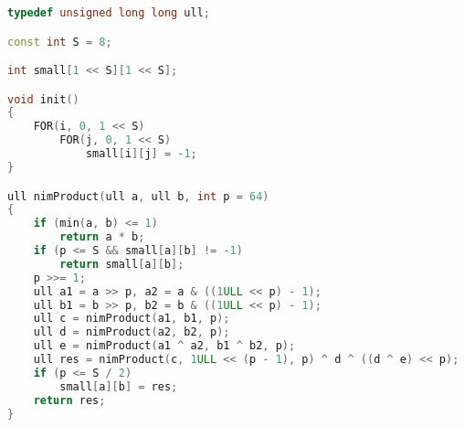 \begin{lstlisting}[caption={nim-product.hpp}, language=C++]
typedef unsigned long long ull;

const int S = 8;

int small[1 << S][1 << S];

void init()
{
	FOR(i, 0, 1 << S)
		FOR(j, 0, 1 << S)
			small[i][j] = -1;
}

ull nimProduct(ull a, ull b, int p = 64)
{
	if (min(a, b) <= 1)
		return a * b;
	if (p <= S && small[a][b] != -1)
		return small[a][b];
	p >>= 1;
	ull a1 = a >> p, a2 = a & ((1ULL << p) - 1);
	ull b1 = b >> p, b2 = b & ((1ULL << p) - 1);
	ull c = nimProduct(a1, b1, p);
	ull d = nimProduct(a2, b2, p);
	ull e = nimProduct(a1 ^ a2, b1 ^ b2, p);
	ull res = nimProduct(c, 1ULL << (p - 1), p) ^ d ^ ((d ^ e) << p);
	if (p <= S / 2)
		small[a][b] = res;
	return res;
}
\end{lstlisting}
